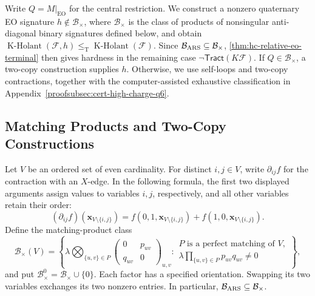 \documentclass[11pt,letterpaper,onecolumn]{article}
\theoremstyle{plain}
\theoremstyle{definition}
\theoremstyle{remark}
\newcommand{\cF}{\mathcal F}
\newcommand{\KHolant}{\operatorname{K\text{-}Holant}}
\newcommand{\Tract}{\mathsf{Tract}}
\newcommand{\EO}{\mathrm{EO}}
\newcommand{\leT}{\leq_{\mathrm T}}
\begin{document}
	Write \(Q=M|_{\EO}\) for the central restriction. We construct a nonzero
	quaternary EO signature \(h\notin\mathcal B_\times\), where
	\(\mathcal B_\times\) is the class of products of nonsingular
	anti-diagonal binary signatures defined below, and obtain
	\(\KHolant(\cF,h)\leT\KHolant(\cF)\).
	Since \(\mathcal B_{\rm ARS}\subseteq\mathcal B_\times\),
	\cref{thm:hc-relative-eo-terminal} then gives hardness in the remaining
	case \(\neg\Tract(K\cF)\).
	If \(Q\in\mathcal B_\times\), a two-copy construction supplies
	\(h\). Otherwise, we use self-loops and two-copy contractions, together
	with the computer-assisted exhaustive classification in Appendix~\ref{proofsubsec:cert-high-charge-q6}.
	
	\subsection{Matching Products and Two-Copy Constructions}
	
	Let \(V\) be an ordered set of even cardinality.  For distinct \(i,j\in V\),
	write \(\partial_{ij}f\) for the contraction with an \(X\)-edge.
	In the following formula, the first two displayed arguments assign values
	to variables \(i,j\), respectively, and all other variables retain their order:
	\[
	(\partial_{ij}f)({\mathbf x}_{V\setminus\{i,j\}})
	=f(0,1,{\mathbf x}_{V\setminus\{i,j\}})
	+f(1,0,{\mathbf x}_{V\setminus\{i,j\}}).
	\]
	Define the matching-product class
	\[
	\mathcal B_\times(V)=
	\left\{\lambda\bigotimes_{\{u,v\}\in P}
	\begin{pmatrix}0&p_{uv}\\q_{uv}&0\end{pmatrix}_{u,v}:
	\begin{array}{l}
		P\text{ is a perfect matching of }V,\\
		\lambda\prod_{\{u,v\}\in P}p_{uv}q_{uv}\ne0
	\end{array}\right\},
	\]
	and put \(\mathcal B_\times^0=\mathcal B_\times\cup\{0\}\).
	Each factor has a specified orientation. Swapping its two variables exchanges its
	two nonzero entries.  In particular,
	\(\mathcal B_{\rm ARS}\subseteq\mathcal B_\times\).

	
	
\end{document}
